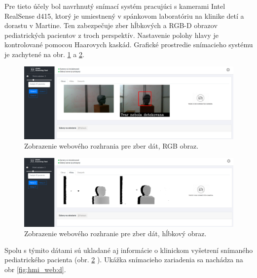 Pre tieto účely bol navrhnutý snímací systém pracujúci s kamerami Intel RealSense d415, ktorý je umiestnený v spánkovom laboratóriu na klinike detí a dorastu v Martine. Ten zabezpečuje zber hĺbkových a RGB-D obrazov pediatrických pacientov z troch perspektív. Nastavenie polohy hlavy je kontrolované pomocou Haarovych kaskád. Grafické prostredie snímacieho systému je zachytené na obr. \ref{fig:hmi_web:a} a \ref{fig:hmi_web:b}.
 

\begin{figure}[H]
	\centering
	\includegraphics[width=\textwidth]{figures/hmi_web1.png}
	\caption{Zobrazenie webového rozhrania pre zber dát, RGB obraz.}
	\label{fig:hmi_web:a}
\end{figure}

\begin{figure}[H]
	\centering
	\includegraphics[width=\textwidth]{figures/hmi_web2.png}
	\caption{Zobrazenie webového rozhranie pre zber dát, hĺbkový obraz.}
	\label{fig:hmi_web:b}
\end{figure}

Spolu s týmito dátami sú ukladané aj informácie o klinickom vyšetrení snímaného pediatrického pacienta (obr. \ref{fig:hmi_web:b} ). Ukážka snímacieho zariadenia sa nachádza na obr \ref{fig:hmi_web:d}. 
